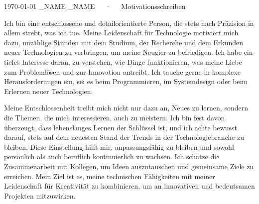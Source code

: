 \documentclass[11pt, a4paper]{awesome-cv}
\begin{document}
\makecvheader[R]

\makecvfooter
  {\today}
  {\FIRST_NAME \LAST_NAME~~~·~~~Motivationsschreiben}
  {}

\makelettertitle

\begin{cvletter}


Ich bin eine entschlossene und detailorientierte Person, die stets nach Präzision in allem strebt, was ich tue. Meine Leidenschaft für Technologie motiviert mich dazu, unzählige Stunden mit dem Studium, der Recherche und dem Erkunden neuer Technologien zu verbringen, um meine Neugier zu befriedigen. Ich habe ein tiefes Interesse daran, zu verstehen, wie Dinge funktionieren, was meine Liebe zum Problemlösen und zur Innovation antreibt. Ich tauche gerne in komplexe Herausforderungen ein, sei es beim Programmieren, im Systemdesign oder beim Erlernen neuer Technologien.

Meine Entschlossenheit treibt mich nicht nur dazu an, Neues zu lernen, sondern die Themen, die mich interessieren, auch zu meistern. Ich bin fest davon überzeugt, dass lebenslanges Lernen der Schlüssel ist, und ich achte bewusst darauf, stets auf dem neuesten Stand der Trends in der Technologiebranche zu bleiben. Diese Einstellung hilft mir, anpassungsfähig zu bleiben und sowohl persönlich als auch beruflich kontinuierlich zu wachsen. Ich schätze die Zusammenarbeit mit Kollegen, um Ideen auszutauschen und gemeinsame Ziele zu erreichen. Mein Ziel ist es, meine technischen Fähigkeiten mit meiner Leidenschaft für Kreativität zu kombinieren, um an innovativen und bedeutsamen Projekten mitzuwirken.



\end{cvletter}
\end{document}
